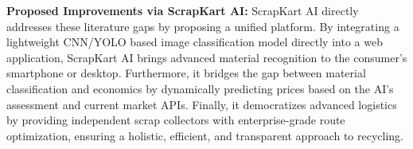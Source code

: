 \textbf{Proposed Improvements via ScrapKart AI:}
ScrapKart AI directly addresses these literature gaps by proposing a unified platform. By integrating a lightweight CNN/YOLO based image classification model directly into a web application, ScrapKart AI brings advanced material recognition to the consumer's smartphone or desktop. Furthermore, it bridges the gap between material classification and economics by dynamically predicting prices based on the AI's assessment and current market APIs. Finally, it democratizes advanced logistics by providing independent scrap collectors with enterprise-grade route optimization, ensuring a holistic, efficient, and transparent approach to recycling.
